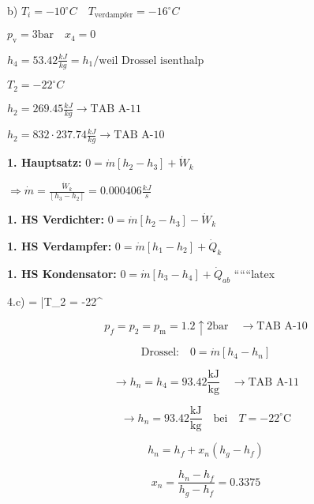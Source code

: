 b) $T_i = -10^\circ C \quad T_{\text{verdampfer}} = -16^\circ C$

$p_{\text{v}} = 3 \text{bar} \quad x_4 = 0$

$h_4 = 53.42 \frac{kJ}{kg} = h_1 / \text{weil Drossel isenthalp}$

$T_2 = -22^\circ C$

$h_2 = 269.45 \frac{kJ}{kg} \rightarrow \text{TAB A-11}$

$h_2 = 832 \cdot 237.74 \frac{kJ}{kg} \rightarrow \text{TAB A-10}$

\textbf{1. Hauptsatz:} $0 = \dot{m} [h_2 - h_3] + \dot{W}_k$

$\Rightarrow \dot{m} = \frac{\dot{W}_k}{[h_3 - h_2]} = 0.000406 \frac{kJ}{s}$

\textbf{1. HS Verdichter:} $0 = \dot{m} [h_2 - h_3] - \dot{W}_k$

\textbf{1. HS Verdampfer:} $0 = \dot{m} [h_1 - h_2] + \dot{Q}_k$

\textbf{1. HS Kondensator:} $0 = \dot{m} [h_3 - h_4] + \dot{Q}_{ab}$
``````latex


4.c) \quad {} =  \quad \bar{T}_2 = -22^\circ {}

\[
p_f = p_2 = p_{\text{m}} = 1.2 \uparrow 2 \text{bar} \quad \rightarrow \text{TAB A-10}
\]

\[
\text{Drossel:} \quad 0 = \dot{m} [h_4 - h_n]
\]

\[
\rightarrow h_n = h_4 = 93.42 \frac{\text{kJ}}{\text{kg}} \quad \rightarrow \text{TAB A-11}
\]

\[
\rightarrow h_n = 93.42 \frac{\text{kJ}}{\text{kg}} \quad \text{bei} \quad T = -22^\circ \text{C}
\]

\[
h_n = h_f + x_n (h_g - h_f)
\]

\[
x_n = \frac{h_n - h_f}{h_g - h_f} = 0.3375
\]